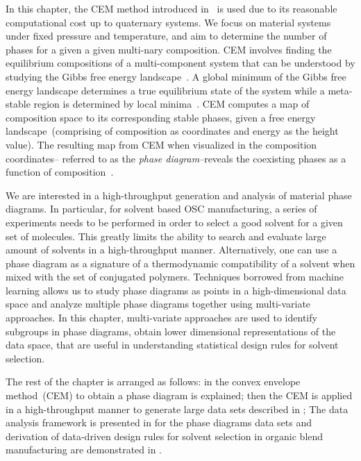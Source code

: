 In this chapter, the CEM method introduced in~\cite{OryllCEM,SoftMatterCEM} is used due to its reasonable computational cost up to
quaternary systems.
We focus on material systems under fixed pressure and temperature, and aim to determine the number of phases for a given a given multi-nary composition.
CEM involves finding the equilibrium compositions of a multi-component system that can be understood by studying the Gibbs free energy landscape~\cite{GibbsCriteria1}. 
A global minimum of the Gibbs free energy landscape determines a true equilibrium state of the system while a meta-stable region is determined by local minima~\cite{OryllCEM,TangentPlaneCriteria,GibbsCriteria1}. 
CEM computes a map of composition space to its corresponding stable phases, given a free energy landscape~(comprising of composition as coordinates and energy as the height value).
The resulting map from CEM when visualized in the composition coordinates-- referred to as the \textit{phase diagram}--reveals the coexisting phases as a function of composition~\cite{SoftMatterCEM}.

We are interested in a high-throughput generation and analysis of material phase diagrams.
In particular, for solvent based OSC manufacturing, a series of experiments needs to be performed in order to select a good solvent for a given set of molecules.
This greatly limits the ability to search and evaluate large amount of solvents in a high-throughput manner.
Alternatively, one can use a phase diagram as a signature of a thermodynamic compatibility of a solvent when mixed with the set of conjugated polymers.
Techniques borrowed from machine learning allows us to study phase diagrams as points in a high-dimensional data space and analyze multiple phase diagrams together using multi-variate approaches.   
In this chapter, multi-variate approaches are used to identify subgroups in phase diagrams, obtain lower dimensional representations of the data space, that are useful in understanding statistical design rules for solvent selection. 

The rest of the chapter is arranged as follows: in  the convex envelope method~(CEM) to obtain a phase diagram is explained; then the CEM is applied in a high-throughput manner to generate large data sets described in ; The data analysis framework is presented in  for the phase diagrams data sets and derivation of data-driven design rules for solvent selection in organic blend manufacturing are demonstrated in .    
